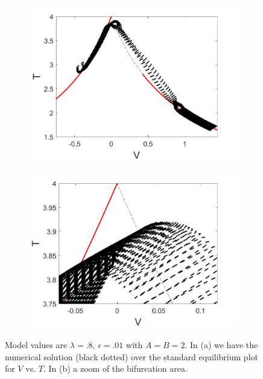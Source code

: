 \begin{figure}[H]
\centering
\begin{subfigure}{.5\textwidth}
  \centering
  \includegraphics[width=\linewidth]{twoD/slowosc_Tplot_small.jpg}
  \caption{}
\end{subfigure}%
\begin{subfigure}{.5\textwidth}
  \centering
  \includegraphics[width=\linewidth]{twoD/slowosc_Tplot_small_zoom.jpg}
  \caption{}
\end{subfigure}
\caption{Model values are $\lambda=.8$, $\epsilon=.01$ with $A=B=2$. In (a) we have the numerical solution (black dotted) over the standard equilibrium plot for $V$ vs. $T$. In (b) a zoom of the bifurcation area.}
\label{fig:twoD_slowosc_Tnumerics_small}
\end{figure}

